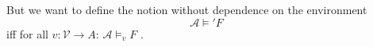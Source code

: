 \newpage

But we want to define the notion without dependence on the environment
$$ \mathcal{A} \models' F$$
iff for all $v: \mathcal{V} \rightarrow A$: $\mathcal{A} \models_v F$ .\\

%	
%	

